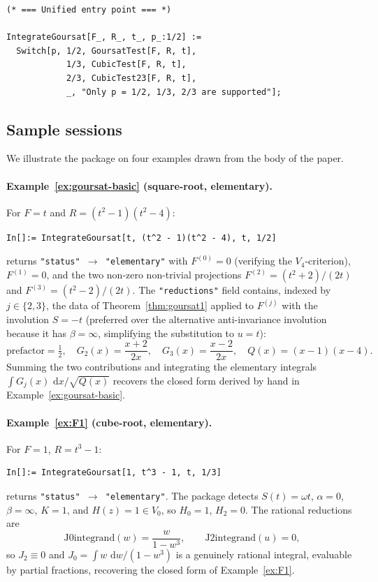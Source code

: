 \documentclass[11pt,a4paper]{article}
\theoremstyle{plain}
\theoremstyle{definition}
\theoremstyle{remark}
\renewcommand{\d}{\,\mathrm{d}}
\begin{document}
\begin{lstlisting}
(* === Unified entry point === *)

IntegrateGoursat[F_, R_, t_, p_:1/2] :=
  Switch[p, 1/2, GoursatTest[F, R, t],
            1/3, CubicTest[F, R, t],
            2/3, CubicTest23[F, R, t],
            _, "Only p = 1/2, 1/3, 2/3 are supported"];
\end{lstlisting}

\subsection*{Sample sessions}

We illustrate the package on four examples drawn from the body of the paper.

\paragraph{Example~\ref{ex:goursat-basic} (square-root, elementary).} For $F=t$ and $R=(t^2-1)(t^2-4)$:
\begin{lstlisting}[basicstyle=\footnotesize\ttfamily,frame=none]
In[]:= IntegrateGoursat[t, (t^2 - 1)(t^2 - 4), t, 1/2]
\end{lstlisting}
returns \texttt{"status"\,$\to$\,"elementary"} with $F^{(0)} = 0$ (verifying the $V_4$-criterion), $F^{(1)} = 0$, and the two non-zero non-trivial projections $F^{(2)} = (t^2+2)/(2t)$ and $F^{(3)} = (t^2-2)/(2t)$. The \texttt{"reductions"} field contains, indexed by $j\in\{2,3\}$, the data of Theorem~\ref{thm:goursat1} applied to $F^{(j)}$ with the involution $S = -t$ (preferred over the alternative anti-invariance involution because it has $\beta=\infty$, simplifying the substitution to $u=t$):
\[
  \text{prefactor} = \tfrac{1}{2},\quad
  G_2(x) = \frac{x+2}{2x},\quad G_3(x) = \frac{x-2}{2x},\quad
  Q(x) = (x-1)(x-4).
\]
Summing the two contributions and integrating the elementary integrals $\int G_j(x)\,\d x/\sqrt{Q(x)}$ recovers the closed form derived by hand in Example~\ref{ex:goursat-basic}.

\paragraph{Example~\ref{ex:F1} (cube-root, elementary).} For $F=1$, $R=t^3-1$:
\begin{lstlisting}[basicstyle=\footnotesize\ttfamily,frame=none]
In[]:= IntegrateGoursat[1, t^3 - 1, t, 1/3]
\end{lstlisting}
returns \texttt{"status"\,$\to$\,"elementary"}. The package detects $S(t) = \omega t$, $\alpha=0$, $\beta=\infty$, $K=1$, and $H(z) = 1 \in V_0$, so $H_0 = 1$, $H_2 = 0$. The rational reductions are
\[
  \text{J0integrand}(w) = \frac{w}{1-w^3},\qquad \text{J2integrand}(u) = 0,
\]
so $J_2 \equiv 0$ and $J_0 = \int w\,\d w/(1-w^3)$ is a genuinely rational integral, evaluable by partial fractions, recovering the closed form of Example~\ref{ex:F1}.
\end{document}
